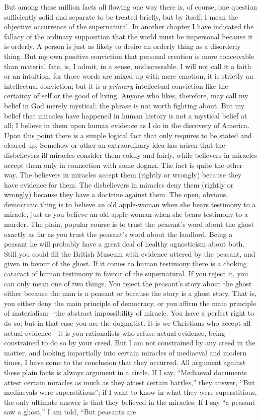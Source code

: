 \documentclass{book}
\begin{document}
But among these million facts all flowing one way there is, of course, one question sufficiently solid and separate to be treated briefly, but by itself; I mean the objective occurrence of the supernatural. In another chapter I have indicated the fallacy of the ordinary supposition that the world must be impersonal because it is orderly. A person is just as likely to desire an orderly thing as a disorderly thing. But my own positive conviction that personal creation is more conceivable than material fate, is, I admit, in a sense, undiscussable. I will not call it a faith or an intuition, for those words are mixed up with mere emotion, it is strictly an intellectual conviction; but it is a \emph{primary} intellectual conviction like the certainty of self or the good of living. Anyone who likes, therefore, may call my belief in God merely mystical; the phrase is not worth fighting about. But my belief that miracles have happened in human history is not a mystical belief at all; I believe in them upon human evidence as I do in the discovery of America. Upon this point there is a simple logical fact that only requires to be stated and cleared up. Somehow or other an extraordinary idea has arisen that the disbelievers ill miracles consider them coldly and fairly, while believers in miracles accept them only in connection with some dogma. The fact is quite the other way. The believers in miracles accept them (rightly or wrongly) because they have evidence for them. The disbelievers in miracles deny them (rightly or wrongly) because they have a doctrine against them. The open, obvious, democratic thing is to believe an old apple-woman when she bears testimony to a miracle, just as you believe an old apple-woman when she bears testimony to a murder. The plain, popular course is to trust the peasant’s word about the ghost exactly as far as you trust the peasant’s word about the landlord. Being a peasant he will probably have a great deal of healthy agnosticism about both. Still you could fill the British Museum with evidence uttered by the peasant, and given in favour of the ghost. If it comes to human testimony there is a choking cataract of human testimony in favour of the supernatural. If you reject it, you can only mean one of two things. You reject the peasant’s story about the ghost either because the man is a peasant or because the story is a ghost story. That is, you either deny the main principle of democracy, or you affirm the main principle of materialism—the abstract impossibility of miracle. You have a perfect right to do so; but in that case you are the dogmatist. It is we Christians who accept all actual evidence—it is you rationalists who refuse actual evidence, being constrained to do so by your creed. But I am not constrained by any creed in the matter, and looking impartially into certain miracles of mediaeval and modern times, I have come to the conclusion that they occurred. All argument against these plain facts is always argument in a circle. If I say, “Mediaeval documents attest certain miracles as much as they attest certain battles,” they answer, “But mediaevals were superstitious”; if I want to know in what they were superstitious, the only ultimate answer is that they believed in the miracles. If I say “a peasant saw a ghost,” I am told, “But peasants are 
\end{document}
